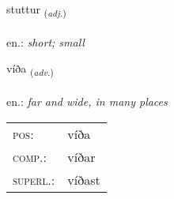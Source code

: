 \documentclass[frontgrid, backgrid]{flacards}\usepackage[]{graphicx}\usepackage[]{xcolor}
\begin{document}
\renewcommand{\blhead}{\vskip5pt {\small\bfseries\footnotesize Lýsingarorð | Adjective }}
\renewcommand{\bcfoot}{\vskip5pt \hspace{2pt}{\small\bfseries\footnotesize 1K}}


{stuttur \small{\textsubscript{(\textit{adj.})}} \\[1ex] %
\textphonetic{[stʏhtʏr]} \\
en.: \emph{short; small} \\  [2ex]
\renewcommand*{\arraystretch}{0.8}
}

\renewcommand{\flhead}{\vskip5pt \fboxsep=0pt {\small\bfseries\footnotesize Atviksorð | Adverb}}
\renewcommand{\fcfoot}{\vskip5pt \fboxsep=0pt \hspace{2pt}{\small\bfseries\footnotesize 1K}}

\renewcommand{\blhead}{\vskip5pt {\small\bfseries\footnotesize Atviksorð | Adverb }}
\renewcommand{\bcfoot}{\vskip5pt \hspace{2pt}{\small\bfseries\footnotesize 1K}}


{víða \small{\textsubscript{(\textit{adv.})}} \\[1ex] %
\textphonetic{[viːða]} \\
en.: \emph{far and wide, in many places} \\  [2ex]
\renewcommand*{\arraystretch}{0.8}
\begin{tabular}{ll}
\textsc{pos}: & víða \\ 
\textsc{comp.}: & víðar \\ 
\textsc{superl.}: & víðast \\
\end{tabular}
}
\end{document}
